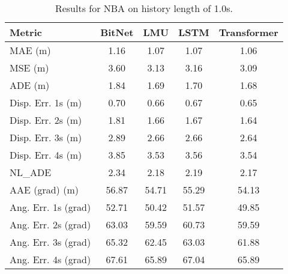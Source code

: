 \begin{table}[H]
\centering
\caption{Results for NBA on history length of 1.0s.}
\label{hist:NBA_1.0s}
\begin{tabular}{l||c|c|c|c}
Metric & BitNet & LMU & LSTM & Transformer \\
\hline \hline
MAE (m) & 1.16 & 1.07 & 1.07 & 1.06 \\
MSE (m) & 3.60 & 3.13 & 3.16 & 3.09 \\
ADE (m) & 1.84 & 1.69 & 1.70 & 1.68 \\
Disp. Err. 1s (m) & 0.70 & 0.66 & 0.67 & 0.65 \\
Disp. Err. 2s (m) & 1.81 & 1.66 & 1.67 & 1.64 \\
Disp. Err. 3s (m) & 2.89 & 2.66 & 2.66 & 2.64 \\
Disp. Err. 4s (m) & 3.85 & 3.53 & 3.56 & 3.54 \\
NL\_ADE & 2.34 & 2.18 & 2.19 & 2.17 \\
AAE (grad) (m) & 56.87 & 54.71 & 55.29 & 54.13 \\
Ang. Err. 1s (grad) & 52.71 & 50.42 & 51.57 & 49.85 \\
Ang. Err. 2s (grad) & 63.03 & 59.59 & 60.73 & 59.59 \\
Ang. Err. 3s (grad) & 65.32 & 62.45 & 63.03 & 61.88 \\
Ang. Err. 4s (grad) & 67.61 & 65.89 & 67.04 & 65.89 \\
\end{tabular}
\end{table}
